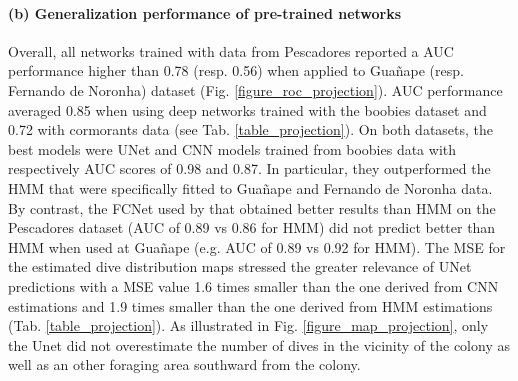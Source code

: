 \documentclass{article}
\begin{document}
\paragraph{(b) Generalization performance of pre-trained networks}
Overall, all networks trained with data from Pescadores reported a AUC performance higher than 0.78 (resp. 0.56) when applied to Guañape (resp. Fernando de Noronha) dataset (Fig. \ref{figure_roc_projection}). AUC performance averaged 0.85 when using deep networks trained with the boobies dataset and 0.72 with cormorants data (see Tab. \ref{table_projection}). On both datasets, the best models were UNet and CNN  models trained from boobies data with respectively AUC scores of 0.98 and 0.87. In particular, they outperformed the HMM that were specifically fitted to Guañape and Fernando de Noronha data. By contrast, the FCNet used by \cite{browning_predicting_2018} that obtained better results than HMM on the Pescadores dataset (AUC of 0.89 vs 0.86 for HMM) did not predict better than HMM when used at Guañape (e.g. AUC of 0.89 vs 0.92 for HMM). The MSE for the estimated dive distribution maps stressed the greater relevance of UNet predictions with a MSE value 1.6 times smaller than the one derived from CNN estimations and 1.9 times smaller than the one derived from HMM estimations (Tab. \ref{table_projection}). As illustrated in Fig. \ref{figure_map_projection}, only the Unet did not overestimate the number of dives in the vicinity of the colony as well as an other foraging area southward from the colony.
\end{document}

